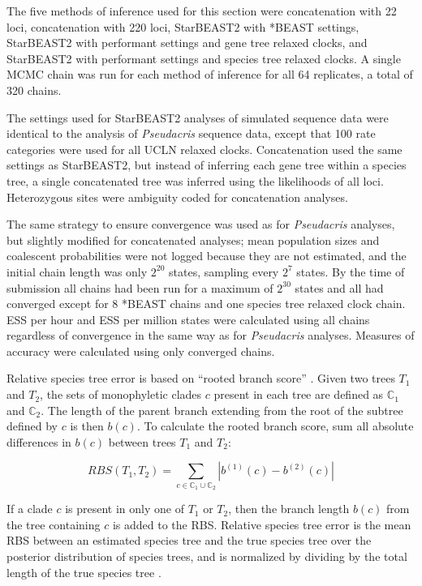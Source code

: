 \documentclass[12pt]{article}
\begin{document}
The five methods of inference used for this section were concatenation with 22
loci, concatenation with 220 loci, StarBEAST2 with *BEAST settings, StarBEAST2
with performant settings and gene tree relaxed clocks, and StarBEAST2 with
performant settings and species tree relaxed clocks. A single MCMC chain was
run for each method of inference for all 64 replicates, a total of 320 chains.

The settings used for StarBEAST2 analyses of simulated sequence data were
identical to the analysis of \textit{Pseudacris} sequence data, except that 100
rate categories were used for all UCLN relaxed clocks. Concatenation used the
same settings as StarBEAST2, but instead of inferring each gene tree within a
species tree, a single concatenated tree was inferred using the likelihoods of
all loci. Heterozygous sites were ambiguity coded for concatenation analyses.

The same strategy to ensure convergence was used as for \textit{Pseudacris}
analyses, but slightly modified for concatenated analyses; mean population sizes
and coalescent probabilities were not logged because they are not estimated, and
the initial chain length was only $2^{20}$ states, sampling every $2^{7}$
states. By the time of submission all chains had been run for a maximum of
$2^{30}$ states and all had converged except for 8 *BEAST chains and one species
tree relaxed clock chain. ESS per hour and ESS per million states were
calculated using all chains regardless of convergence in the same way as for
\textit{Pseudacris} analyses. Measures of accuracy were calculated using only
converged chains.

Relative species tree error is based on ``rooted branch score''
\citep[RBS;][]{Heled2013}. Given two trees $T_1$ and $T_2$, the sets of
monophyletic clades $c$ present in each tree are defined as $\mathbb{C}_1$ and
$\mathbb{C}_2$. The length of the parent branch extending from the root of the
subtree defined by $c$ is then $b(c)$. To calculate the rooted branch score, sum
all absolute differences in $b(c)$ between trees $T_1$ and $T_2$:

\begin{equation}
RBS(T_1, T_2) = \sum_{c \in {\mathbb{C}_1} \cup {\mathbb{C}_2}} |b^{(1)}(c) - b^{(2)}(c)|
\end{equation}

If a clade $c$ is present in only one of $T_1$ or $T_2$, then the branch length
$b(c)$ from the tree containing $c$ is added to the RBS. Relative species tree
error is the mean RBS between an estimated species tree and the true
species tree over the posterior distribution of species trees, and is normalized
by dividing by the total length of the true species tree
\citep{Ogilvie01052016}.
\end{document}
